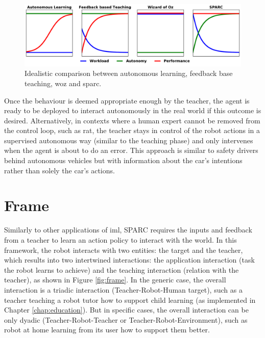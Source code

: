 \begin{figure}[ht]
	\includegraphics[width=1\linewidth]{concept.pdf}
	\centering
	\caption{Idealistic comparison between autonomous learning, feedback base teaching, \gls{woz} and \gls{sparc}.}
	\label{fig:concept}
\end{figure}

Once the behaviour is deemed appropriate enough by the teacher, the agent is ready to be deployed to interact autonomously in the real world if this outcome is desired. Alternatively, in contexts where a human expert cannot be removed from the control loop, such as \acrlong{rat}, the teacher stays in control of the robot actions in a supervised autonomous way (similar to the teaching phase) and only intervenes when the agent is about to do an error. This approach is similar to safety drivers behind autonomous vehicles but with information about the car's intentions rather than solely the car's actions. 

\section{Frame}

Similarly to other applications of \gls{iml}, SPARC requires the inputs and feedback from a teacher to learn an action policy to interact with the world. In this framework, the robot interacts with two entities: the target and the teacher, which results into two intertwined interactions: the application interaction (task the robot learns to achieve) and the teaching interaction (relation with the teacher), as shown in Figure \ref{fig:frame}. In the generic case, the overall interaction is a triadic interaction (Teacher-Robot-Human target), such as a teacher teaching a robot tutor how to support child learning (as implemented in Chapter \ref{chap:education}). But in specific cases, the overall interaction can be only dyadic (Teacher-Robot-Teacher or Teacher-Robot-Environment), such as  robot at home learning from its user how to support them better.

